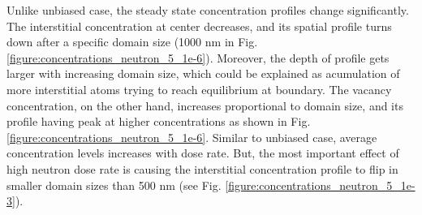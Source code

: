 \documentclass[a4paper]{article}
\begin{document}
       Unlike unbiased case, the steady state concentration profiles change significantly. The interstitial concentration at center decreases, and its spatial profile turns down after a specific domain size (1000 nm in Fig. \ref{figure:concentrations_neutron_5_1e-6}). Moreover, the depth of profile gets larger with increasing domain size, which could be explained as acumulation of more interstitial atoms trying to reach equilibrium at boundary. The vacancy concentration, on the other hand, increases proportional to domain size, and its profile having peak at higher concentrations as shown in Fig. \ref{figure:concentrations_neutron_5_1e-6}. Similar to unbiased case, average concentration levels increases with dose rate. But, the most important effect of high neutron dose rate is causing the interstitial concentration profile to flip in smaller domain sizes than 500 nm (see Fig. \ref{figure:concentrations_neutron_5_1e-3}).
\end{document}
